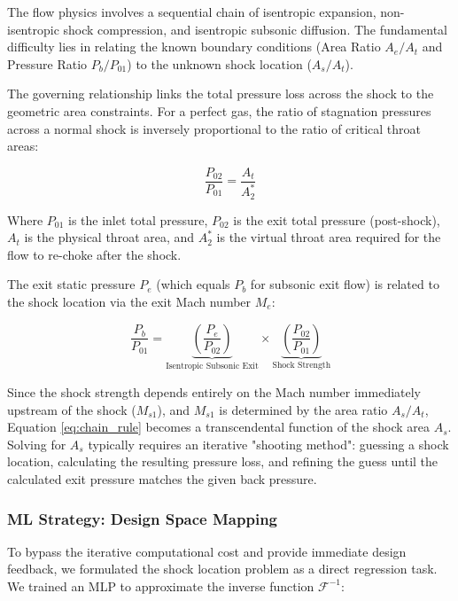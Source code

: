 \documentclass[preprint,12pt]{elsarticle}
\begin{document}
The flow physics involves a sequential chain of isentropic expansion, non-isentropic shock compression, and isentropic subsonic diffusion. The fundamental difficulty lies in relating the known boundary conditions (Area Ratio $A_e/A_t$ and Pressure Ratio $P_b/P_{01}$) to the unknown shock location ($A_s/A_t$).

The governing relationship links the total pressure loss across the shock to the geometric area constraints. For a perfect gas, the ratio of stagnation pressures across a normal shock is inversely proportional to the ratio of critical throat areas:

\begin{equation}
    \frac{P_{02}}{P_{01}} = \frac{A_t}{A^*_{2}}
    \label{eq:total_pressure_loss}
\end{equation}

Where $P_{01}$ is the inlet total pressure, $P_{02}$ is the exit total pressure (post-shock), $A_t$ is the physical throat area, and $A^*_{2}$ is the virtual throat area required for the flow to re-choke after the shock.

The exit static pressure $P_e$ (which equals $P_b$ for subsonic exit flow) is related to the shock location via the exit Mach number $M_e$:

\begin{equation}
    \frac{P_b}{P_{01}} = \underbrace{\left( \frac{P_e}{P_{02}} \right)}_{\text{Isentropic Subsonic Exit}} \times \underbrace{\left( \frac{P_{02}}{P_{01}} \right)}_{\text{Shock Strength}}
    \label{eq:chain_rule}
\end{equation}

Since the shock strength depends entirely on the Mach number immediately upstream of the shock ($M_{s1}$), and $M_{s1}$ is determined by the area ratio $A_s/A_t$, Equation \ref{eq:chain_rule} becomes a transcendental function of the shock area $A_s$. Solving for $A_s$ typically requires an iterative "shooting method": guessing a shock location, calculating the resulting pressure loss, and refining the guess until the calculated exit pressure matches the given back pressure.

\subsubsection{ML Strategy: Design Space Mapping}

To bypass the iterative computational cost and provide immediate design feedback, we formulated the shock location problem as a direct regression task. We trained an MLP to approximate the inverse function $\mathcal{F}^{-1}$:
\end{document}
